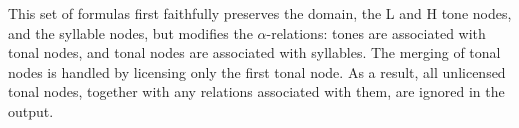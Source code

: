 This set of formulas first faithfully preserves the domain, the L and H tone nodes, and the syllable nodes, but modifies the $\alpha$-relations: tones are associated with tonal nodes, and tonal nodes are associated with syllables. The merging of tonal nodes is handled by licensing only the first tonal node. As a result, all unlicensed tonal nodes, together with any relations associated with them, are ignored in the output.

